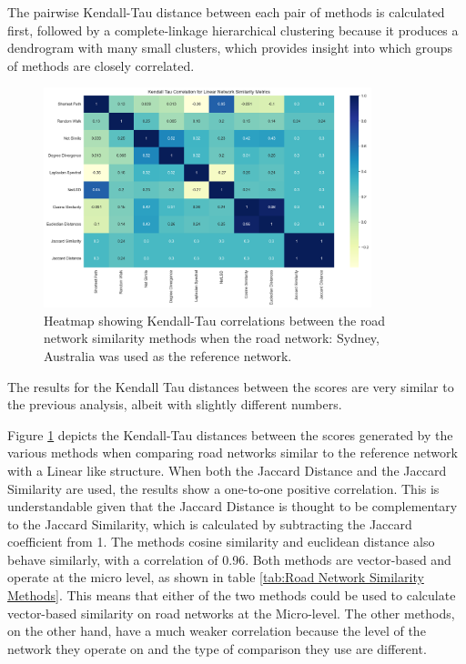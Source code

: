 The pairwise Kendall-Tau distance between each pair of methods is calculated first, followed by a complete-linkage hierarchical clustering because it produces a dendrogram with many small clusters, which provides insight into which groups of methods are closely correlated.

\begin{figure}[!ht]
\centering
\includegraphics[width=0.85\textwidth,center]{picture/Linear/linear2.png}
\caption[Heatmap showing Kendall-Tau correlations between the road network similarity methods for Linear Road Networks]{Heatmap showing Kendall-Tau correlations between the road network similarity methods when the road network: Sydney, Australia was used as the reference network.}
\label{fig:network ranking linear}
\end{figure}

The results for the Kendall Tau distances between the scores are very similar to the previous analysis, albeit with slightly different numbers.

Figure \ref{fig:network ranking linear} depicts the Kendall-Tau distances between the scores generated by the various methods when comparing road networks similar to the reference network with a Linear like structure. When both the Jaccard Distance and the Jaccard Similarity are used, the results show a one-to-one positive correlation. This is understandable given that the Jaccard Distance is thought to be complementary to the Jaccard Similarity, which is calculated by subtracting the Jaccard coefficient from 1. The methods cosine similarity and euclidean distance also behave similarly, with a correlation of 0.96. Both methods are vector-based and operate at the micro level, as shown in table \ref{tab:Road Network Similarity Methods}. This means that either of the two methods could be used to calculate vector-based similarity on road networks at the Micro-level. The other methods, on the other hand, have a much weaker correlation because the level of the network they operate on and the type of comparison they use are different.

